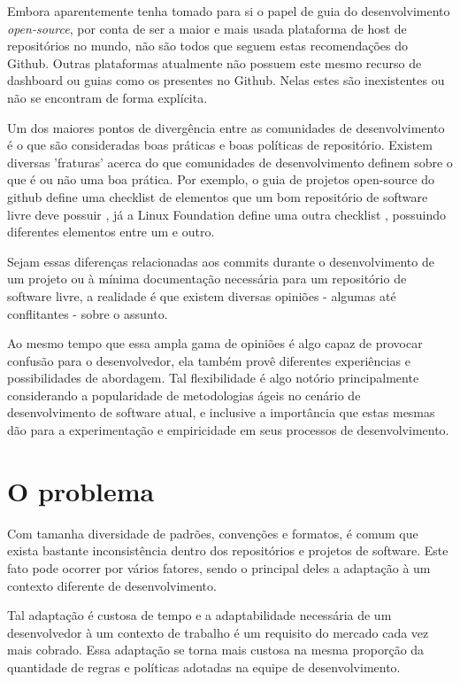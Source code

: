 Embora aparentemente tenha tomado para si o papel de guia do desenvolvimento \textit{open-source}, por conta de ser a maior e mais usada plataforma de host de repositórios no mundo, não são todos que seguem estas recomendações do Github.
Outras plataformas atualmente não possuem este mesmo recurso de dashboard ou guias como os presentes no Github. Nelas estes são inexistentes ou não se encontram de forma explícita.

Um dos maiores pontos de divergência entre as comunidades de desenvolvimento é o que são consideradas boas práticas e boas políticas de repositório. Existem diversas 'fraturas' acerca do que comunidades de desenvolvimento definem sobre o que é ou não uma boa prática. Por exemplo, o guia de projetos open-source do github define uma checklist de elementos que um bom repositório de software livre deve possuir \cite{opensource_checklist_github}, já a Linux Foundation define uma outra checklist \cite{opensource_checklist_linux_foundation}, possuindo diferentes elementos entre um e outro.

Sejam essas diferenças relacionadas aos commits durante o desenvolvimento de um projeto ou à mínima documentação necessária para um repositório de software livre, a realidade é que existem diversas opiniões - algumas até conflitantes - sobre o assunto.

Ao mesmo tempo que essa ampla gama de opiniões é algo capaz de provocar confusão para o desenvolvedor, ela também provê diferentes experiências e possibilidades de abordagem. Tal flexibilidade é algo notório principalmente considerando a popularidade de metodologias ágeis no cenário de desenvolvimento de software atual, e inclusive a importância que estas mesmas dão para a experimentação e empiricidade em seus processos de desenvolvimento.








\section{O problema}
Com tamanha diversidade de padrões, convenções e formatos, é comum que exista bastante inconsistência dentro dos repositórios e projetos de software. Este fato pode ocorrer por vários fatores, sendo o principal deles a adaptação à um contexto diferente de desenvolvimento.

Tal adaptação é custosa de tempo e a adaptabilidade necessária de um desenvolvedor à um contexto de trabalho é um requisito do mercado cada vez mais cobrado. Essa adaptação se torna mais custosa na mesma proporção da quantidade de regras e políticas adotadas na equipe de desenvolvimento.


